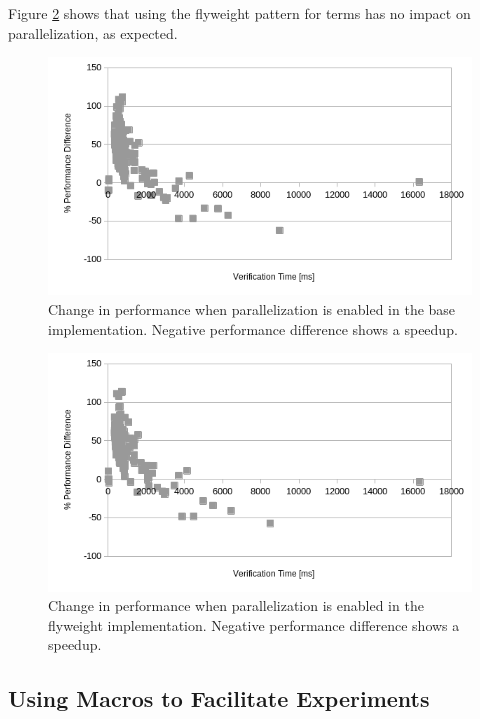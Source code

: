 \documentclass[11pt]{article}
\begin{document}
    Figure \ref{fig:parallelization-flyweight} shows that using the flyweight
    pattern for terms has no impact on parallelization, as expected.

    \begin{figure}[H]
        \includegraphics[width=\linewidth]{parallelization.png}
        \caption{Change in performance when parallelization is enabled in the base implementation. Negative performance difference shows a speedup.}
        \label{fig:parallelization}
    \end{figure}

    \begin{figure}[H]
        \includegraphics[width=\linewidth]{parallelization-flyweight.png}
        \caption{
            Change in performance when parallelization is enabled in the flyweight implementation.
            Negative performance difference shows a speedup.
        }
        \label{fig:parallelization-flyweight}
    \end{figure}


    \subsection{Using Macros to Facilitate Experiments}
\end{document}
